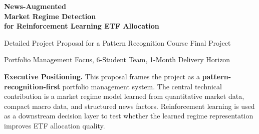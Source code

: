 \documentclass[11pt,a4paper]{article}
\begin{document}
\hypersetup{pageanchor=false}
\begin{titlepage}

\vspace*{1.4cm}

{\color{white}\sffamily\bfseries\fontsize{24}{28}\selectfont
News-Augmented\\[0.12em]
Market Regime Detection\\[0.12em]
for Reinforcement Learning ETF Allocation\par}

\vspace{0.8cm}

{\color{white}\Large\sffamily Detailed Project Proposal for a Pattern Recognition Course Final Project\par}

\vspace{0.6cm}

{\color{white}\large\sffamily Portfolio Management Focus, 6-Student Team, 1-Month Delivery Horizon\par}

\vspace{1.3cm}

\begin{summarybox}[width=\textwidth,colback=white,colframe=white]
\textbf{\color{navy}Executive Positioning.}
This proposal frames the project as a \textbf{pattern-recognition-first} portfolio management system.
The central technical contribution is a market regime model learned from quantitative market data, compact macro data, and structured news factors.
Reinforcement learning is used as a downstream decision layer to test whether the learned regime representation improves ETF allocation quality.
\end{summarybox}

\vspace{0.5cm}


\end{titlepage}
\end{document}
